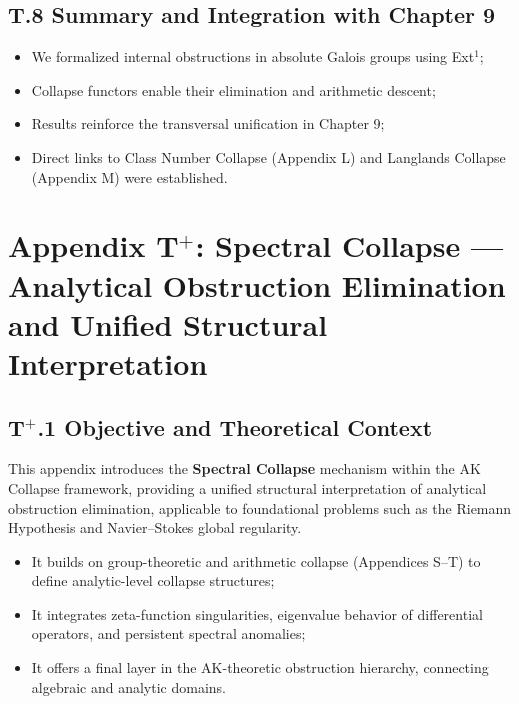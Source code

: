 \documentclass[11pt]{article}
\begin{document}
\subsection*{T.8 Summary and Integration with Chapter 9}

\begin{itemize}
    \item We formalized internal obstructions in absolute Galois groups using Ext$^1$;
    \item Collapse functors enable their elimination and arithmetic descent;
    \item Results reinforce the transversal unification in Chapter 9;
    \item Direct links to Class Number Collapse (Appendix L) and Langlands Collapse (Appendix M) were established.
\end{itemize}





\section*{Appendix T$^{+}$: Spectral Collapse — Analytical Obstruction Elimination and Unified Structural Interpretation}

\subsection*{T$^{+}$.1 Objective and Theoretical Context}

This appendix introduces the \textbf{Spectral Collapse} mechanism within the AK Collapse framework, providing a unified structural interpretation of analytical obstruction elimination, applicable to foundational problems such as the Riemann Hypothesis and Navier–Stokes global regularity.

\begin{itemize}
    \item It builds on group-theoretic and arithmetic collapse (Appendices S–T) to define analytic-level collapse structures;
    \item It integrates zeta-function singularities, eigenvalue behavior of differential operators, and persistent spectral anomalies;
    \item It offers a final layer in the AK-theoretic obstruction hierarchy, connecting algebraic and analytic domains.
\end{itemize}
\end{document}

